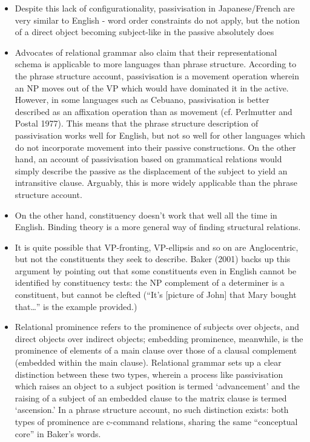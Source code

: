 \documentclass{article}
\begin{document}
\begin{itemize}
\begin{itemize}
    \end{itemize}
    \item Despite this lack of configurationality, passivisation in Japanese/French are very similar to English - word order constraints do not apply, but the notion of a direct object becoming subject-like in the passive absolutely does
    \item Advocates of relational grammar also claim that their representational schema is applicable to more languages than phrase structure. According to the phrase structure account, passivisation is a movement operation wherein an NP moves out of the VP which would have dominated it in the active. However, in some languages such as Cebuano, passivisation is better described as an affixation operation than as movement (cf. Perlmutter and Postal 1977). This means that the phrase structure description of passivisation works well for English, but not so well for other languages which do not incorporate movement into their passive constructions. On the other hand, an account of passivisation based on grammatical relations would simply describe the passive as the displacement of the subject to yield an intransitive clause. Arguably, this is more widely applicable than the phrase structure account.
    \item On the other hand, constituency doesn't work that well all the time in English. Binding theory is a more general way of finding structural relations.
    \item It is quite possible that VP-fronting, VP-ellipsis and so on are Anglocentric, but not the constituents they seek to describe. Baker (2001) backs up this argument by pointing out that some constituents even in English cannot be identified by constituency tests: the NP complement of a determiner is a constituent, but cannot be clefted (“It’s [picture of John] that Mary bought that…” is the example provided.)
    \item Relational prominence refers to the prominence of subjects over objects, and direct objects over indirect objects; embedding prominence, meanwhile, is the prominence of elements of a main clause over those of a clausal complement (embedded within the main clause). Relational grammar sets up a clear distinction between these two types, wherein a process like passivisation which raises an object to a subject position is termed ‘advancement’ and the raising of a subject of an embedded clause to the matrix clause is termed ‘ascension.’ In a phrase structure account, no such distinction exists: both types of prominence are c-command relations, sharing the same “conceptual core” in Baker’s words.

\end{itemize}
\end{document}
